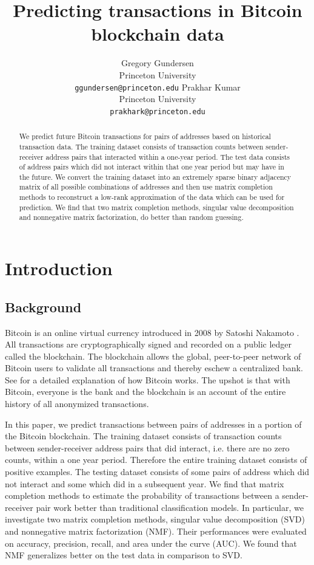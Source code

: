 \documentclass{article} %
\title{Predicting transactions in Bitcoin blockchain data}
\author{
Gregory Gundersen\\
Princeton University\\
\texttt{ggundersen@princeton.edu}
\And
Prakhar Kumar \\
Princeton University \\
\texttt{prakhark@princeton.edu} \\
}
\begin{document}
\maketitle

\begin{abstract}
We predict future Bitcoin transactions for pairs of addresses based on historical transaction data. The training dataset consists of transaction counts between sender-receiver address pairs that interacted within a one-year period. The test data consists of address pairs which did not interact within that one year period but may have in the future. We convert the training dataset into an extremely sparse binary adjacency matrix of all possible combinations of addresses and then use matrix completion methods to reconstruct a low-rank approximation of the data which can be used for prediction. We find that two matrix completion methods, singular value decomposition and nonnegative matrix factorization, do better than random guessing.
\end{abstract}

\section{Introduction}

\subsection{Background}

Bitcoin is an online virtual currency introduced in 2008 by Satoshi Nakamoto \cite{nakamoto2008bitcoin}. All transactions are cryptographically signed and recorded on a public ledger called the blockchain. The blockchain allows the global, peer-to-peer network of Bitcoin users to validate all transactions and thereby eschew a centralized bank. See \cite{nielsen2013bitcoin} for a detailed explanation of how Bitcoin works. The upshot is that with Bitcoin, everyone is the bank and the blockchain is an account of the entire history of all anonymized transactions.

In this paper, we predict transactions between pairs of addresses in a portion of the Bitcoin blockchain. The training dataset consists of transaction counts between sender-receiver address pairs that did interact, i.e. there are no zero counts, within a one year period. Therefore the entire training dataset consists of positive examples. The testing dataset consists of some pairs of address which did not interact and some which did in a subsequent year. We find that matrix completion methods to estimate the probability of transactions between a sender-receiver pair work better than traditional classification models. In particular, we investigate two matrix completion methods, singular value decomposition (SVD) and nonnegative matrix factorization (NMF). Their performances were evaluated on accuracy, precision, recall, and area under the curve (AUC). We found that NMF generalizes better on the test data in comparison to SVD.
\end{document}
